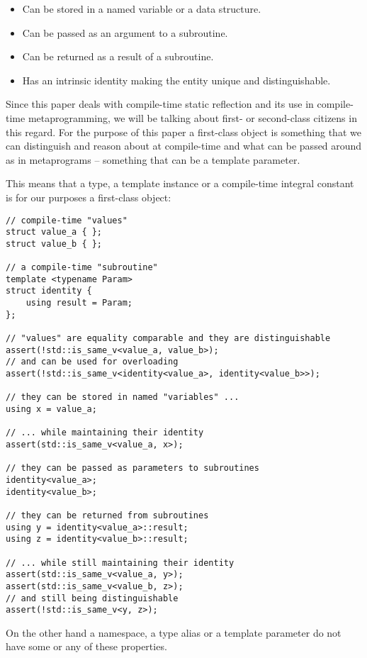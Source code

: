 \begin{itemize}
	\item{Can be stored in a named variable or a data structure.}
	\item{Can be passed as an argument to a subroutine.}
	\item{Can be returned as a result of a subroutine.}
	\item{Has an intrinsic identity making the entity unique and distinguishable.}
\end{itemize}

Since this paper deals with compile-time static reflection and its use
in compile-time metaprogramming, we will be talking about first- or second-class
citizens in this regard. 
For the purpose of this paper a first-class object is something that
we can distinguish and reason about at compile-time and what can be passed around
as  in metaprograms -- something that can be a template parameter.

This means that a type, a template instance or a compile-time integral constant
is for our purposes a first-class object:

\begin{verbatim}
// compile-time "values"
struct value_a { };
struct value_b { };

// a compile-time "subroutine"
template <typename Param>
struct identity {
	using result = Param;
};

// "values" are equality comparable and they are distinguishable
assert(!std::is_same_v<value_a, value_b>);
// and can be used for overloading
assert(!std::is_same_v<identity<value_a>, identity<value_b>>);

// they can be stored in named "variables" ...
using x = value_a;

// ... while maintaining their identity
assert(std::is_same_v<value_a, x>);

// they can be passed as parameters to subroutines
identity<value_a>;
identity<value_b>;

// they can be returned from subroutines
using y = identity<value_a>::result;
using z = identity<value_b>::result;

// ... while still maintaining their identity
assert(std::is_same_v<value_a, y>);
assert(std::is_same_v<value_b, z>);
// and still being distinguishable
assert(!std::is_same_v<y, z>);
\end{verbatim}


On the other hand a namespace, a type alias or a template parameter do not have
some or any of these properties.

